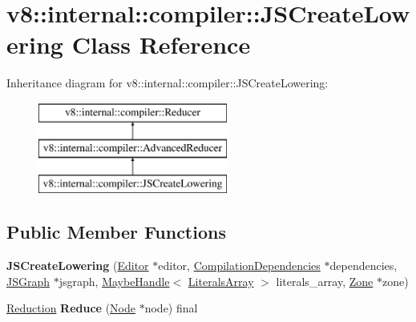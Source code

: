 \hypertarget{classv8_1_1internal_1_1compiler_1_1_j_s_create_lowering}{}\section{v8\+:\+:internal\+:\+:compiler\+:\+:J\+S\+Create\+Lowering Class Reference}
\label{classv8_1_1internal_1_1compiler_1_1_j_s_create_lowering}
Inheritance diagram for v8\+:\+:internal\+:\+:compiler\+:\+:J\+S\+Create\+Lowering\+:\begin{figure}[H]
\begin{center}
\leavevmode
\includegraphics[height=3.000000cm]{classv8_1_1internal_1_1compiler_1_1_j_s_create_lowering}
\end{center}
\end{figure}
\subsection*{Public Member Functions}
\begin{DoxyCompactItemize}
\item 
{\bfseries J\+S\+Create\+Lowering} (\hyperlink{classv8_1_1internal_1_1compiler_1_1_advanced_reducer_1_1_editor}{Editor} $\ast$editor, \hyperlink{classv8_1_1internal_1_1_compilation_dependencies}{Compilation\+Dependencies} $\ast$dependencies, \hyperlink{classv8_1_1internal_1_1compiler_1_1_j_s_graph}{J\+S\+Graph} $\ast$jsgraph, \hyperlink{classv8_1_1internal_1_1_maybe_handle}{Maybe\+Handle}$<$ \hyperlink{classv8_1_1internal_1_1_literals_array}{Literals\+Array} $>$ literals\+\_\+array, \hyperlink{classv8_1_1internal_1_1_zone}{Zone} $\ast$zone)\hypertarget{classv8_1_1internal_1_1compiler_1_1_j_s_create_lowering_af34e56910058bd318a50a95e2593ab5e}{}\label{classv8_1_1internal_1_1compiler_1_1_j_s_create_lowering_af34e56910058bd318a50a95e2593ab5e}

\item 
\hyperlink{classv8_1_1internal_1_1compiler_1_1_reduction}{Reduction} {\bfseries Reduce} (\hyperlink{classv8_1_1internal_1_1compiler_1_1_node}{Node} $\ast$node) final\hypertarget{classv8_1_1internal_1_1compiler_1_1_j_s_create_lowering_a61676b71f60e5a2c69c9bc3a1d35c7fc}{}\label{classv8_1_1internal_1_1compiler_1_1_j_s_create_lowering_a61676b71f60e5a2c69c9bc3a1d35c7fc}

\end{DoxyCompactItemize}
